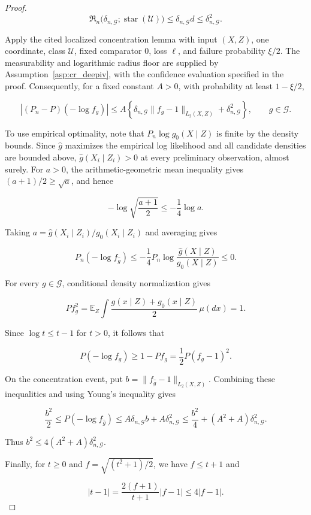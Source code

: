 \begin{proof}
\[
\mathfrak R_n\bigl(\delta_{n,\mathcal G};\operatorname{star}(\mathcal U)\bigr)
\leqslant\delta_{n,\mathcal G}d
\leqslant\delta_{n,\mathcal G}^2.
\]

Apply the cited localized concentration lemma with input $(X,Z)$, one coordinate, class $\mathcal U$, fixed comparator $0$, loss $\ell$, and failure probability $\xi/2$. The measurability and logarithmic radius floor are supplied by Assumption~\ref{asp:cr_deepiv}, with the confidence evaluation specified in the proof. Consequently, for a fixed constant $A>0$, with probability at least $1-\xi/2$,

\[
\left|(P_n-P)(-\log f_g)\right|
\leqslant A\left\{\delta_{n,\mathcal G}\|f_g-1\|_{L_2(X,Z)}+\delta_{n,\mathcal G}^2\right\},
\qquad g\in\mathcal G.
\]
 

To use empirical optimality, note that $P_n\log g_0(X\mid Z)$ is finite by the density bounds. Since $\hat g$ maximizes the empirical log likelihood and all candidate densities are bounded above, $\hat g(X_i\mid Z_i)>0$ at every preliminary observation, almost surely. For $a>0$, the arithmetic-geometric mean inequality gives $(a+1)/2\geqslant\sqrt a$, and hence

\[
-\log\sqrt{\frac{a+1}{2}}\leqslant-\frac14\log a.
\]

Taking $a=\hat g(X_i\mid Z_i)/g_0(X_i\mid Z_i)$ and averaging gives

\[
P_n(-\log f_{\hat g})
\leqslant-\frac14P_n\log\frac{\hat g(X\mid Z)}{g_0(X\mid Z)}
\leqslant0.
\]

For every $g\in\mathcal G$, conditional density normalization gives

\[
P f_g^2
=\mathbb E_Z\int\frac{g(x\mid Z)+g_0(x\mid Z)}2\,\mu(dx)=1.
\]

Since $\log t\leqslant t-1$ for $t>0$, it follows that

\[
P(-\log f_g)\geqslant1-Pf_g
=\frac12P(f_g-1)^2.
\]

On the concentration event, put $b=\|f_{\hat g}-1\|_{L_2(X,Z)}$. Combining these inequalities and using Young's inequality gives

\[
\frac{b^2}{2}
\leqslant P(-\log f_{\hat g})
\leqslant A\delta_{n,\mathcal G}b+A\delta_{n,\mathcal G}^2
\leqslant\frac{b^2}{4}+(A^2+A)\delta_{n,\mathcal G}^2.
\]

Thus $b^2\leqslant4(A^2+A)\delta_{n,\mathcal G}^2$. 

Finally, for $t\geqslant0$ and $f=\sqrt{(t^2+1)/2}$, we have $f\leqslant t+1$ and

\[
|t-1|=\frac{2(f+1)}{t+1}|f-1|\leqslant4|f-1|.
\]


\end{proof}
